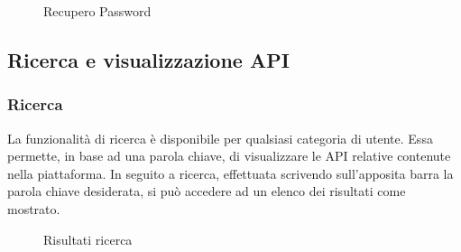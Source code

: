 	\label{Recupero Password}
	\begin{figure}[H]
		\centering
		\caption{Recupero Password}
	\end{figure}

\subsection{Ricerca e visualizzazione API}

\subsubsection{Ricerca}
La funzionalità di ricerca è disponibile per qualsiasi categoria di utente. Essa permette, in base ad una parola chiave, di visualizzare le API relative contenute nella piattaforma. In seguito a ricerca, effettuata scrivendo sull'apposita barra la parola chiave desiderata, si può accedere ad un elenco dei risultati come mostrato. 

\label{Risultati ricerca}
\begin{figure}[H]
	\centering
	\caption{Risultati ricerca}
\end{figure}


